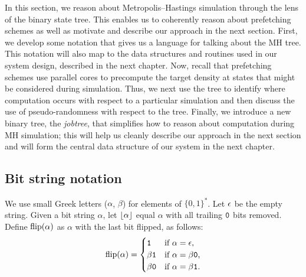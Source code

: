 \documentclass[angelino.tex]{subfiles}
\begin{document}
In this section, we reason about Metropolis--Hastings simulation through the
lens of the binary state tree.
This enables us to coherently reason about prefetching schemes as well as
motivate and describe our approach in the next section.
%
First, we develop some notation that gives us a language for talking about
the MH tree.
This notation will also map to the data structures and routines
used in our system design, described in the next chapter.
%
Now, recall that prefetching schemes use parallel cores to precompute the target
density at states that might be considered during simulation.
Thus, we next use the tree to identify where computation occurs with respect to
a particular simulation and then discuss the use of pseudo-randomness with
respect to the tree.
Finally, we introduce a new binary tree, the \emph{jobtree}, that simplifies how to reason about
computation during MH simulation; this will help us cleanly describe our
approach in the next section and will form the central data structure of our
system in the next chapter.

\subsection{Bit string notation}
\label{sec:bit-strings}

We use small Greek letters ($\alpha$, $\beta$) for elements of $\{0,1\}^*$.
Let $\epsilon$ be the empty string.
Given a bit string $\alpha$, let ${\lfloor\alpha\rfloor}$ equal $\alpha$
with all trailing $\texttt{0}$ bits removed.
Define ${\text{flip}(\alpha)}$ as $\alpha$ with the last bit flipped, as
follows:
%
\[ {\text{flip}(\alpha)} = \begin{cases}
   \texttt{1} & \text{if $\alpha = \epsilon$,} \\
   \beta\texttt{1} & \text{if $\alpha = \beta\texttt{0}$,} \\
   \beta\texttt{0} & \text{if $\alpha = \beta\texttt{1}$.}
   \end{cases} \]
\end{document}
